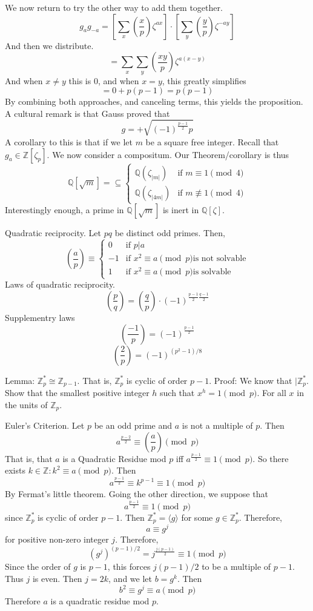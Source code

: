 \documentclass{article}
\begin{document}
We now return to try the other way to add them together. 
\[ g_a g_{-a} = \left[ \sum_x \left(\frac{x}{p}\right)\zeta^{ax} \right] \cdot
\left[ \sum_y \left(\frac{y}{p}\right) \zeta^{-ay} \right] \]
And then we distribute. 
\[ = \sum_x \sum_y \left(\frac{xy}{p}\right) \zeta^{a(x - y)} \]
And when $x \neq y$ this is 0, and when $x = y$, this greatly simplifies
\[ = 0 + p(p-1) = p(p-1) \]
By combining both approaches, and canceling terms, this yields the proposition.
A cultural remark is that Gauss proved that
\[ g = + \sqrt{(-1)^{\frac{p-1}{2}} p } \]
A corollary to this is that if we let $m$ be a square free integer. Recall that
$g_a \in \mathbb{Z}[\zeta_p]$. We now consider a compositum. Our
Theorem/corollary is thus
\[ \mathbb{Q}[\sqrt{m}] = \subseteq \begin{cases} 
\mathbb{Q}(\zeta_{|m|}) &\text{if } m\equiv 1 \pmod{4} \\
\mathbb{Q}(\zeta_{|4m|}) &\text{if } m \not\equiv 1 \pmod{4}\end{cases} \]
Interestingly enough, a prime in $\mathbb{Q}[\sqrt{m}]$ is inert in
$\mathbb{Q}[\zeta]$.

Quadratic reciprocity. Let $pq$ be distinct odd primes. Then,
\[ \left(\frac{a}{p}\right) \equiv \begin{cases} 0 &\text{if } p | a\\
-1 &\text{if } x^2 \equiv a \pmod{p} \text{is not solvable}\\
1 &\text{if }  x^2 \equiv a\pmod{p} \text{is solvable} \end{cases} \]
Laws of quadratic reciprocity.
\[ \left(\frac{p}{q}\right) =
\left(\frac{q}{p}\right)\cdot(-1)^{\frac{p-1}{2}\frac{q-1}{2}} \]
Supplementry laws
\[ \left(\frac{-1}{p}\right) = (-1)^{\frac{p-1}{2}} \]
\[ \left(\frac{2}{p}\right) = (-1)^{(p^2-1)/8} \]

Lemma: $\mathbb{Z}_p^* \cong \mathbb{Z}_{p-1}$. That is, $\mathbb{Z}_p^*$ is
cyclic of order $p-1$. Proof: We know that $|\mathbb{Z}_p^*$. Show that the
smallest positive integer $h$ such that $x^h = 1\pmod{p}$. For all $x$ in the
units of $\mathbb{Z}_p$. 

Euler's Criterion. Let $p$ be an odd prime and $a$ is not a multiple of $p$.
Then
\[ a^{\frac{p-2}{2}} \equiv \left(\frac{a}{p}\right) \pmod{p} \]
That is, that $a$ is a Quadratic Residue mod $p$ iff $a^{\frac{p-1}{2}} \equiv 1
\pmod{p}$. So there exists $k\in \mathbb{Z}: k^2 \equiv a \pmod{p}$. Then
\[ a^{\frac{p-1}{2}} \equiv k^{p-1} \equiv 1 \pmod{p} \]
By Fermat's little theorem. Going the other direction, we suppose that 
\[ a^{\frac{p-1}{2}} \equiv 1 \pmod{p} \]
since $\mathbb{Z}_p^*$ is cyclic of order $p-1$. Then $\mathbb{Z}_p^* = \langle
g \rangle $ for some $g \in \mathbb{Z}_p^*$. Therefore, 
\[ a \equiv g^j \]
for positive non-zero integer $j$. Therefore, 
\[ (g^j)^{(p-1)/2} = j^{\frac{j(p-1)}{2}} \equiv 1 \pmod{p} \]
Since the order of $g$ is $p-1$, this forces $j(p-1)/2$ to be a multiple of
$p-1$. Thus $j$ is even. Then $j = 2k$, and we let $b = g^k$. Then
\[ b^2 \equiv g^j \equiv a \pmod{p} \]
Therefore
$a$ is a quadratic residue mod $p$. 
\end{document}
